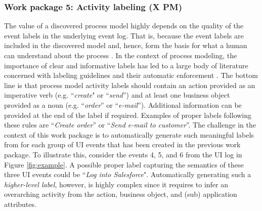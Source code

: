 \subsubsection{Work package 5: Activity labeling (X PM)}
\label{sec:wp5}

The value of a discovered process model highly depends on the quality of the event labels in the underlying event log. That is, because the event labels are included in the discovered model and, hence, form the basis for what a human can understand about the process \cite{mendling2010activity,Leopold2013Book}. In the context of process modeling, the importance of clear and informative labels has led to a large body of literature concerned with labeling guidelines \cite{mendling2010seven,leopold2015learning} and their automatic enforcement \cite{leopold2013detection,becker2009towards}. The bottom line is that process model activity labels should contain an action provided as an imperative verb (e.g. ``\textit{create}" or ``\textit{send}'') and at least one business object provided as a noun (e.g. ``\textit{order}'' or ``\textit{e-mail}''). Additional information can be provided at the end of the label if required. Examples of proper labels following these rules are ``\textit{Create order}'' or ``\textit{Send e-mail to customer}''. The challenge in the context of this work package is to automatically generate such meaningful labels from for each group of UI events that has been created in the previous work package. To illustrate this, consider the events 4, 5, and 6 from the UI log in Figure \ref{fig:example}. A possible proper label capturing the semantics of these three UI events could be ``\textit{Log into Salesforce}". Automatically generating such a \textit{higher-level label}, however, is highly complex since it requires to infer an overarching activity from the action, business object, and (sub) application attributes.

